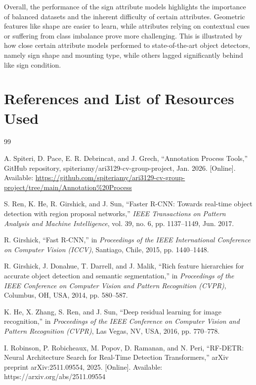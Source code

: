 \documentclass{article}
\begin{document}
Overall, the performance of the sign attribute models highlights the importance of balanced datasets and the inherent difficulty of certain attributes. Geometric features like shape are easier to learn, while attributes relying on contextual cues or suffering from class imbalance prove more challenging. This is illustrated by how close certain attribute models performed to state-of-the-art object detectors, namely sign shape and mounting type, while others lagged significantly behind like sign condition.

\newpage
{}
\section{References and List of Resources Used}

\begin{thebibliography}{99}

    A. Spiteri, D. Pace, E. R. Debrincat, and J. Grech, ``Annotation Process Tools,'' GitHub repository, spiteriamy/ari3129-cv-group-project, Jan. 2026. [Online]. Available: \url{https://github.com/spiteriamy/ari3129-cv-group-project/tree/main/Annotation\%20Process}

    S. Ren, K. He, R. Girshick, and J. Sun, ``Faster R-CNN: Towards real-time object detection with region proposal networks,'' \textit{IEEE Transactions on Pattern Analysis and Machine Intelligence}, vol. 39, no. 6, pp. 1137--1149, Jun. 2017.

    R. Girshick, ``Fast R-CNN,'' in \textit{Proceedings of the IEEE International Conference on Computer Vision (ICCV)}, Santiago, Chile, 2015, pp. 1440--1448.

    R. Girshick, J. Donahue, T. Darrell, and J. Malik, ``Rich feature hierarchies for accurate object detection and semantic segmentation,'' in \textit{Proceedings of the IEEE Conference on Computer Vision and Pattern Recognition (CVPR)}, Columbus, OH, USA, 2014, pp. 580--587.

    K. He, X. Zhang, S. Ren, and J. Sun, ``Deep residual learning for image recognition,'' in \textit{Proceedings of the IEEE Conference on Computer Vision and Pattern Recognition (CVPR)}, Las Vegas, NV, USA, 2016, pp. 770--778.


    I. Robinson, P. Robicheaux, M. Popov, D. Ramanan, and N. Peri, ``RF-DETR: Neural Architecture Search for Real-Time Detection Transformers,'' arXiv preprint arXiv:2511.09554, 2025. [Online]. Available: https://arxiv.org/abs/2511.09554


\end{thebibliography}
\end{document}
